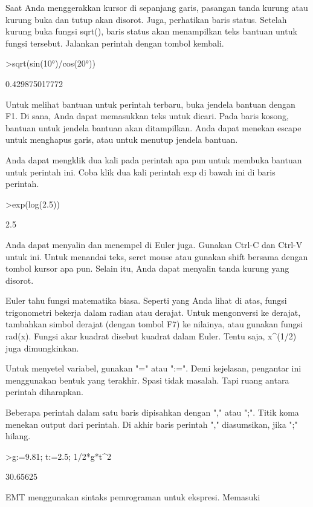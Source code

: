 \documentclass[a4paper,10pt]{article}
\begin{document}
\begin{eulernotebook}
\begin{eulercomment}
\begin{eulercomment}
\begin{eulercomment}
Saat Anda menggerakkan kursor di sepanjang garis, pasangan tanda
kurung atau kurung buka dan tutup akan disorot. Juga, perhatikan baris
status. Setelah kurung buka fungsi sqrt(), baris status akan
menampilkan teks bantuan untuk fungsi tersebut. Jalankan perintah
dengan tombol kembali.
\end{eulercomment}
\begin{eulerprompt}
>sqrt(sin(10°)/cos(20°))
\end{eulerprompt}
\begin{euleroutput}
  0.429875017772
\end{euleroutput}
\begin{eulercomment}
Untuk melihat bantuan untuk perintah terbaru, buka jendela bantuan
dengan F1. Di sana, Anda dapat memasukkan teks untuk dicari. Pada
baris kosong, bantuan untuk jendela bantuan akan ditampilkan. Anda
dapat menekan escape untuk menghapus garis, atau untuk menutup jendela
bantuan.

Anda dapat mengklik dua kali pada perintah apa pun untuk membuka
bantuan untuk perintah ini. Coba klik dua kali perintah exp di bawah
ini di baris perintah.
\end{eulercomment}
\begin{eulerprompt}
>exp(log(2.5))
\end{eulerprompt}
\begin{euleroutput}
  2.5
\end{euleroutput}
\begin{eulercomment}
Anda dapat menyalin dan menempel di Euler juga. Gunakan Ctrl-C dan
Ctrl-V untuk ini. Untuk menandai teks, seret mouse atau gunakan shift
bersama dengan tombol kursor apa pun. Selain itu, Anda dapat menyalin
tanda kurung yang disorot.
\end{eulercomment}
\begin{eulercomment}
Euler tahu fungsi matematika biasa. Seperti yang Anda lihat di atas,
fungsi trigonometri bekerja dalam radian atau derajat. Untuk
mengonversi ke derajat, tambahkan simbol derajat (dengan tombol F7) ke
nilainya, atau gunakan fungsi rad(x). Fungsi akar kuadrat disebut
kuadrat dalam Euler. Tentu saja, x\textasciicircum{}(1/2) juga dimungkinkan.

Untuk menyetel variabel, gunakan "=" atau ":=". Demi kejelasan,
pengantar ini menggunakan bentuk yang terakhir. Spasi tidak masalah.
Tapi ruang antara perintah diharapkan.

Beberapa perintah dalam satu baris dipisahkan dengan "," atau ";".
Titik koma menekan output dari perintah. Di akhir baris perintah ","
diasumsikan, jika ";" hilang.
\end{eulercomment}
\begin{eulerprompt}
>g:=9.81; t:=2.5; 1/2*g*t^2
\end{eulerprompt}
\begin{euleroutput}
  30.65625
\end{euleroutput}
\begin{eulercomment}
EMT menggunakan sintaks pemrograman untuk ekspresi. Memasuki


\end{eulercomment}
\end{eulercomment}
\end{eulercomment}
\end{eulernotebook}
\end{document}
